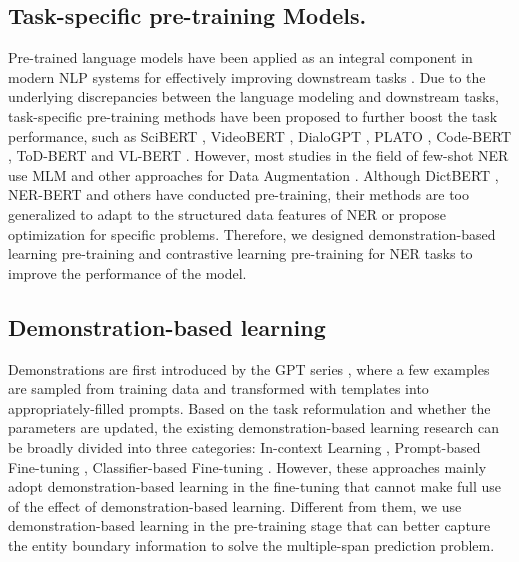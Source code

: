 \documentclass[sigconf,natbib=true,anonymous=False]{acmart}
\begin{document}
\subsection{Task-specific pre-training Models.}
Pre-trained language models have been applied as an integral component in modern NLP systems for effectively improving downstream tasks \cite{peters1802deep,radford2019language,zhang-etal-2023-pay,devlin2018bert,yang2019xlnet,liu2019roberta,qixiang-etal-2022-exploiting,zeng2022semisupervised}. Due to the underlying discrepancies between the language modeling and downstream tasks, task-specific pre-training methods have been proposed to further boost the task performance, such as SciBERT \cite{beltagy2019scibert}, VideoBERT \cite{sun2019videobert}, DialoGPT \cite{zhang2019dialogpt}, PLATO \cite{bao2019plato}, Code-BERT \cite{feng2020codebert}, ToD-BERT \cite{wu2020tod} and VL-BERT \cite{su2019vl}. However, most studies in the field of few-shot NER use MLM and other approaches for Data Augmentation \cite{hou2018sequence,zhou2022melm,dong2022pssat}. Although DictBERT \cite{chen2022dictbert}, NER-BERT \cite{liu2021ner} and others have conducted pre-training, their methods are too generalized to adapt to the structured data features of NER or propose optimization for specific problems. Therefore, we designed demonstration-based learning pre-training and contrastive learning pre-training for NER tasks to improve the performance of the model.


\subsection{Demonstration-based learning}
\label{sec:demonstration}
Demonstrations are first introduced by the GPT series \cite{radford2019language,brown2020language}, where a few examples are sampled from training data and transformed with templates into appropriately-filled prompts. Based on the task reformulation and whether the parameters are updated, the existing demonstration-based learning research can be broadly divided into three categories: In-context Learning \cite{brown2020language,zhao2021calibrate,min2021noisy,wei2022chain}, Prompt-based Fine-tuning \cite{liang2022contrastive}, Classifier-based Fine-tuning \cite{lee2021good,yuan2023scaling}. However, these approaches mainly adopt demonstration-based learning in the fine-tuning that cannot make full use of the effect of demonstration-based learning. Different from them, we use demonstration-based learning in the pre-training stage that can better capture the entity boundary information to solve the multiple-span prediction problem.
\end{document}
